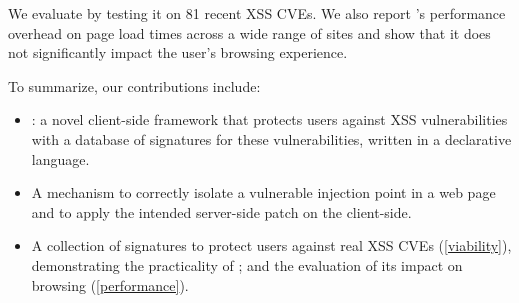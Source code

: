 

We evaluate \sys by
testing it on 81 recent \ac{XSS} CVEs. %
%
We also report \sys{}'s performance overhead on page load times
across a wide range of sites and show that it does not significantly
impact the user's browsing experience.

To summarize, our contributions include:
\begin{itemize}

	\item \sys: a novel client-side framework that protects
          users against XSS vulnerabilities with a database of
          signatures for these vulnerabilities, written in a
          declarative language.

	\item A mechanism to correctly isolate a vulnerable injection
          point in a web page and to apply the intended server-side
          patch on the client-side.

	\item A collection of signatures to protect users against
          real XSS CVEs (\autoref{viability}), demonstrating the practicality
          of \sys; and the evaluation of its impact on browsing (\autoref{performance}). %

\end{itemize}
